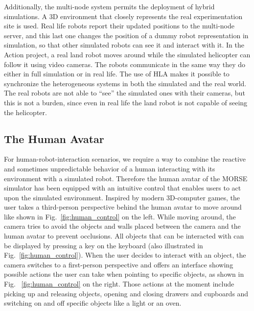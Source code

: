 \documentclass{llncs}
\begin{document}
Additionally, the multi-node system permits the deployment of hybrid
simulations. A 3D environment that closely represents the real experimentation
site is used. Real life robots report their updated positions to the multi-node
server, and this last one changes the position of a dummy robot representation
in simulation, so that other simulated robots can see it and interact with it.
In the Action project, a real land robot moves around while the simulated
helicopter can follow it using video cameras.
The robots communicate in the same way they do either in full simulation or in
real life. The use of HLA makes it possible to synchronize the heterogeneous
systems in both the simulated and the real world.
The real robots are not able to ``see'' the simulated ones with their
cameras, but this is not a burden, since even in real life the land
robot is not capable of seeing the helicopter.

\subsection{The Human Avatar}
\label{section:human}

For human-robot-interaction scenarios, we require a way to combine the
reactive and sometimes unpredictable behavior of a human interacting with its
environment with a simulated robot. Therefore the human avatar of the MORSE
simulator has been equipped with an intuitive control that enables users to act
upon the simulated environment. Inspired by modern 3D-computer games, the user
takes a third-person perspective behind the human avatar to move around like
shown in Fig.~\ref{fig:human_control} on the left.
While moving around, the camera tries to avoid the objects and walls placed
between the camera and the human avatar to prevent occlusions.  All objects
that can be interacted with can be displayed by pressing a key on the
keyboard (also illustrated in Fig.~\ref{fig:human_control}). When the user
decides to interact with an object, the camera switches to a first-person
perspective and offers an interface showing possible actions the
user can take when pointing to specific objects, as shown in Fig.~
\ref{fig:human_control} on the right. Those actions at the moment include
picking up and releasing objects, opening and closing drawers and cupboards and
switching on and off specific objects like a light or an oven.
\end{document}

